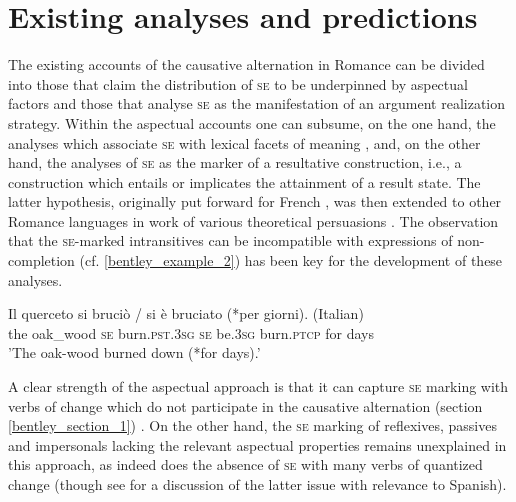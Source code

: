 \documentclass[output=paper,colorlinks,citecolor=brown
]{langscibook}
\begin{document}
\section{Existing analyses and predictions}
\label{bentley_section_2}
The existing accounts of the causative alternation in Romance can be divided into those that claim the distribution of \textsc{se} to be underpinned by aspectual factors and those that analyse \textsc{se} as the manifestation of an argument realization strategy. Within the aspectual accounts one can subsume, on the one hand, the analyses which associate \textsc{se} with lexical facets of meaning \citep{cennamo2012aspectual,cennamo2015valency,cennamo2021anticausatives,vivanco2021scalar}, and, on the other hand, the analyses of \textsc{se} as the marker of a resultative construction, i.e., a construction which entails or implicates the attainment of a result state. The latter hypothesis, originally put forward for French \citep{zribi1987reflexivite}, was then extended to other Romance languages in work of various theoretical persuasions \citep{jezek2003classi,folli2002constructing,folli2005consuming,manente2008laspect,labelle2010anticausative,cennamo2011anticausative,cennamo2012aspectual}. The observation that the \textsc{se}-marked intransitives can be incompatible with expressions of non-completion (cf. \ref{bentley_example_2}) has been key for the development of these analyses.

\ea  \label{bentley_example_2}
\gll
Il querceto si bruciò / si è bruciato {(*per giorni)}. (Italian) \\
the	oak\_wood \textsc{se} burn.\textsc{pst}.3\textsc{sg} {} \textsc{se} be.3\textsc{sg} burn.\textsc{ptcp} {for days} {} \\
\glt
'The oak-wood burned down (*for days).’ \\
\citep[401]{cennamo2012aspectual}
\z

A clear strength of the aspectual approach is that it can capture \textsc{se} marking with verbs of change which do not participate in the causative alternation (section \ref{bentley_section_1}) \citep{miguel2000operador,acedomatellan2022argument}. On the other hand, the \textsc{se} marking of reflexives, passives and impersonals lacking the relevant aspectual properties remains unexplained in this approach, as indeed does the absence of \textsc{se} with many verbs of quantized change (though see \cite{vivanco2021scalar} for a discussion of the latter issue with relevance to Spanish).
\end{document}
